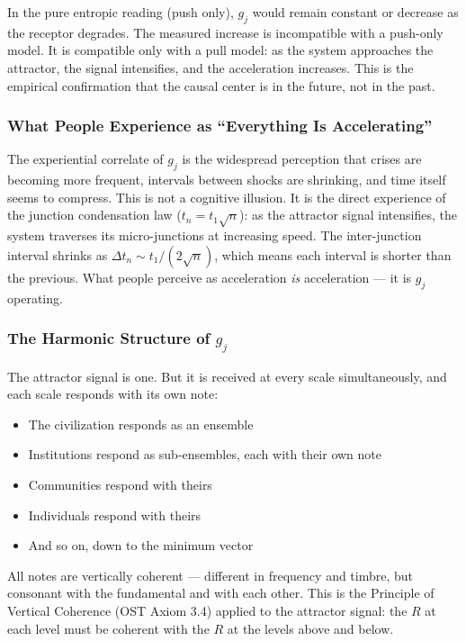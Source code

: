 \documentclass[12pt,a4paper]{article}
\newcommand{\gj}{g_j}
\begin{document}
In the pure entropic reading (push only), $\gj$ would remain constant or decrease as the receptor degrades. The measured increase is incompatible with a push-only model. It is compatible only with a pull model: as the system approaches the attractor, the signal intensifies, and the acceleration increases. This is the empirical confirmation that the causal center is in the future, not in the past.

\subsubsection{What People Experience as ``Everything Is Accelerating''}

The experiential correlate of $\gj$ is the widespread perception that crises are becoming more frequent, intervals between shocks are shrinking, and time itself seems to compress. This is not a cognitive illusion. It is the direct experience of the junction condensation law ($t_n = t_1\sqrt{n}$): as the attractor signal intensifies, the system traverses its micro-junctions at increasing speed. The inter-junction interval shrinks as $\Delta t_n \sim t_1/(2\sqrt{n})$, which means each interval is shorter than the previous. What people perceive as acceleration \emph{is} acceleration --- it is $\gj$ operating.

\subsubsection{The Harmonic Structure of $\gj$}

The attractor signal is one. But it is received at every scale simultaneously, and each scale responds with its own note:

\begin{itemize}[leftmargin=2em]
    \item The civilization responds as an ensemble
    \item Institutions respond as sub-ensembles, each with their own note
    \item Communities respond with theirs
    \item Individuals respond with theirs
    \item And so on, down to the minimum vector
\end{itemize}

All notes are vertically coherent --- different in frequency and timbre, but consonant with the fundamental and with each other. This is the Principle of Vertical Coherence (OST Axiom 3.4) applied to the attractor signal: the $R$ at each level must be coherent with the $R$ at the levels above and below.
\end{document}
